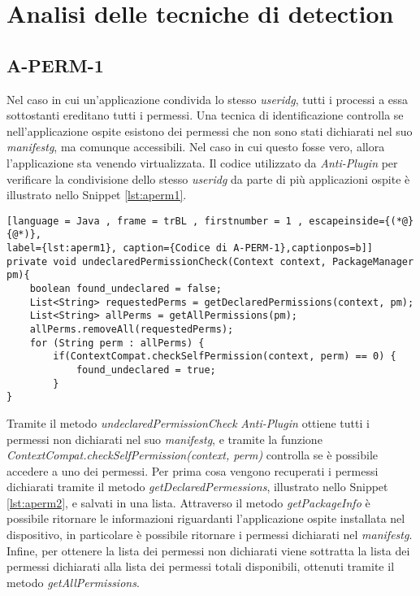 \newpage


\section{Analisi delle tecniche di detection}
\label{sec:analisi_tecniche}

\subsection*{A-PERM-1}
\label{a-perm-1}


Nel caso in cui un'applicazione condivida lo stesso \emph{\gls{useridg}}, tutti i processi a essa sottostanti ereditano tutti i permessi. Una tecnica di identificazione controlla se nell'applicazione ospite esistono dei permessi che non sono stati dichiarati nel suo \emph{\gls{manifestg}}, ma comunque accessibili. Nel caso in cui questo fosse vero, allora l'applicazione sta venendo virtualizzata.
Il codice utilizzato da \emph{Anti-Plugin} per verificare la condivisione dello stesso \emph{\gls{useridg}} da parte di più applicazioni ospite è illustrato nello Snippet \ref{lst:aperm1}.


\begin{lstlisting}[language = Java , frame = trBL , firstnumber = 1 , escapeinside={(*@}{@*)},
label={lst:aperm1}, caption={Codice di A-PERM-1},captionpos=b]]
private void undeclaredPermissionCheck(Context context, PackageManager pm){
    boolean found_undeclared = false;
    List<String> requestedPerms = getDeclaredPermissions(context, pm);
    List<String> allPerms = getAllPermissions(pm);
    allPerms.removeAll(requestedPerms);
    for (String perm : allPerms) {
        if(ContextCompat.checkSelfPermission(context, perm) == 0) {
            found_undeclared = true;
        }
}
\end{lstlisting}


Tramite il metodo \emph{undeclaredPermissionCheck} \emph{Anti-Plugin} ottiene tutti i permessi non dichiarati nel suo \emph{\gls{manifestg}}, e tramite la funzione \emph{ContextCompat.checkSelfPermission(context, perm)} controlla se è possibile accedere a uno dei permessi. 
Per prima cosa vengono recuperati i permessi dichiarati tramite il metodo \emph{getDeclaredPermessions}, illustrato nello Snippet \ref{lst:aperm2}, e salvati in una lista. Attraverso il metodo \emph{getPackageInfo} è possibile ritornare le informazioni riguardanti l'applicazione ospite installata nel dispositivo, in particolare è possibile ritornare i permessi dichiarati nel \emph{\gls{manifestg}}.
Infine, per ottenere la lista dei permessi non dichiarati viene sottratta la lista dei permessi dichiarati alla lista dei permessi totali disponibili, ottenuti tramite il metodo \emph{getAllPermissions}.


